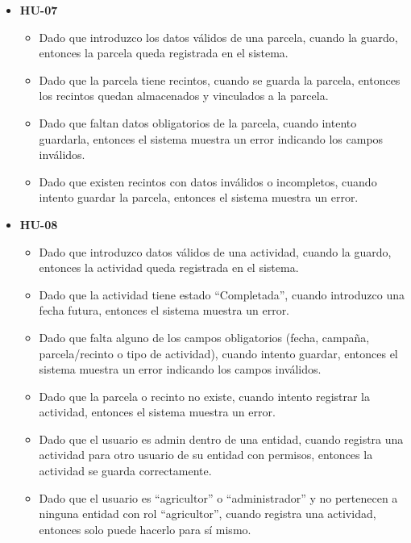 \begin{itemize}
    \item \textbf{HU-07}
    \begin{itemize}
        \item Dado que introduzco los datos válidos de una parcela, cuando la guardo, entonces la parcela queda registrada en el sistema.
        \item Dado que la parcela tiene recintos, cuando se guarda la parcela, entonces los recintos quedan almacenados y vinculados a la parcela.
        \item Dado que faltan datos obligatorios de la parcela, cuando intento guardarla, entonces el sistema muestra un error indicando los campos inválidos.
        \item Dado que existen recintos con datos inválidos o incompletos, cuando intento guardar la parcela, entonces el sistema muestra un error.
    \end{itemize}
\end{itemize}

\begin{itemize}
    \item \textbf{HU-08}
    \begin{itemize}
        \item Dado que introduzco datos válidos de una actividad, cuando la guardo, entonces la actividad queda registrada en el sistema.
        \item Dado que la actividad tiene estado ``Completada'', cuando introduzco una fecha futura, entonces el sistema muestra un error.
        \item Dado que falta alguno de los campos obligatorios (fecha, campaña, parcela/recinto o tipo de actividad), cuando intento guardar, entonces el 
        sistema muestra un error indicando los campos inválidos.
        \item Dado que la parcela o recinto no existe, cuando intento registrar la actividad, entonces el sistema muestra un error.
        \item Dado que el usuario es admin dentro de una entidad, cuando registra una actividad para otro usuario de su entidad con permisos, entonces la 
        actividad se guarda correctamente.
        \item Dado que el usuario es ``agricultor'' o ``administrador'' y no pertenecen a ninguna entidad con rol ``agricultor'', cuando registra una actividad, 
        entonces solo puede hacerlo para sí mismo.
    \end{itemize}
\end{itemize}

